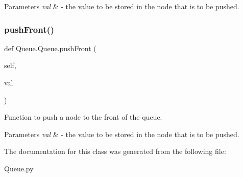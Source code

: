 \begin{DoxyParams}{Parameters}
{\em val} & -\/ the value to be stored in the node that is to be pushed. \\
\hline
\end{DoxyParams}
\mbox{\label{class_queue_1_1_queue_a17b55e82b5a8db529ff6a23a6b14bb03}} 
\subsubsection{\texorpdfstring{push\+Front()}{pushFront()}}
{\footnotesize\ttfamily def Queue.\+Queue.\+push\+Front (\begin{DoxyParamCaption}\item[{}]{self,  }\item[{}]{val }\end{DoxyParamCaption})}



Function to push a node to the front of the queue. 


\begin{DoxyParams}{Parameters}
{\em val} & -\/ the value to be stored in the node that is to be pushed. \\
\hline
\end{DoxyParams}


The documentation for this class was generated from the following file\+:\begin{DoxyCompactItemize}
\item 
Queue.\+py\end{DoxyCompactItemize}
